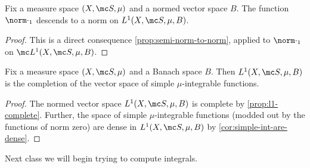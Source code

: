 \documentclass[../notes.tex]{subfiles}
\begin{document}
\begin{lemma}
	Fix a measure space $(X,\mc S,\mu)$ and a normed vector space $B$. The function $\norm\cdot_1$ descends to a norm on $L^1(X,\mc S,\mu,B)$.
\end{lemma}
\begin{proof}
	This is a direct consequence \autoref{prop:semi-norm-to-norm}, applied to $\norm\cdot_1$ on $\mc L^1(X,\mc S,\mu,B)$.
\end{proof}
\begin{corollary} \label{cor:l1-complete}
	Fix a measure space $(X,\mc S,\mu)$ and a Banach space $B$. Then $L^1(X,\mc S,\mu,B)$ is the completion of the vector space of simple $\mu$-integrable functions.
\end{corollary}
\begin{proof}
	The normed vector space $L^1(X,\mc S,\mu,B)$ is complete by \autoref{prop:l1-complete}. Further, the space of simple $\mu$-integrable functions (modded out by the functions of norm zero) are dense in $L^1(X,\mc S,\mu,B)$ by \autoref{cor:simple-int-are-dense}.
\end{proof}
Next class we will begin trying to compute integrals.
\end{document}
